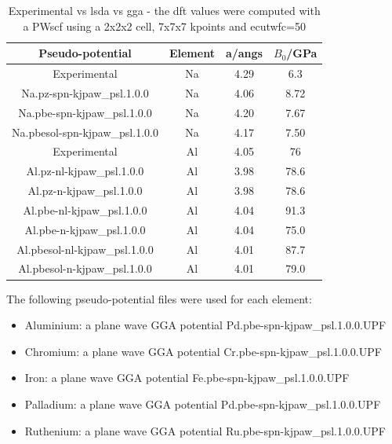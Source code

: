 \FloatBarrier 
\begin{table}[h]
\begin{center}
\renewcommand{\arraystretch}{1.2}
\begin{tabular}{c c c c}
\hline\hline
Pseudo-potential & Element & a/angs & $B_0$/GPa \\
\hline\hline
Experimental    & Na      & 4.29\cite{periodictablena} & 6.3\cite{periodictablena} \\
Na.pz-spn-kjpaw\_psl.1.0.0 & Na & 4.06 & 8.72 \\
Na.pbe-spn-kjpaw\_psl.1.0.0 & Na & 4.20 & 7.67 \\
Na.pbesol-spn-kjpaw\_psl.1.0.0 & Na & 4.17 & 7.50 \\
Experimental    & Al      & 4.05\cite{periodictableal} & 76\cite{periodictableal} \\
Al.pz-nl-kjpaw\_psl.1.0.0 & Al & 3.98 & 78.6 \\
Al.pz-n-kjpaw\_psl.1.0.0 & Al & 3.98 & 78.6 \\
Al.pbe-nl-kjpaw\_psl.1.0.0 & Al & 4.04 & 91.3 \\
Al.pbe-n-kjpaw\_psl.1.0.0 & Al & 4.04 & 75.0 \\
Al.pbesol-nl-kjpaw\_psl.1.0.0 & Al & 4.01 & 87.7 \\
Al.pbesol-n-kjpaw\_psl.1.0.0 & Al & 4.01 & 79.0 \\
\hline\hline
\end{tabular}
\end{center}
\caption{Experimental vs \acrshort{lsda} vs \acrshort{gga} - the \acrshort{dft} values were computed with a PWscf\cite{quantumespresso} using a 2x2x2 cell, 7x7x7 kpoints and ecutwfc=50}
\label{table:ggavslsdacopy}
\end{table}

\FloatBarrier 

The following pseudo-potential files were used for each element:

\begin{itemize}
\item Aluminium: a plane wave GGA potential Pd.pbe-spn-kjpaw\_psl.1.0.0.UPF
\item Chromium: a plane wave GGA potential Cr.pbe-spn-kjpaw\_psl.1.0.0.UPF
\item Iron: a plane wave GGA potential Fe.pbe-spn-kjpaw\_psl.1.0.0.UPF 
\item Palladium: a plane wave GGA potential Pd.pbe-spn-kjpaw\_psl.1.0.0.UPF
\item Ruthenium: a plane wave GGA potential Ru.pbe-spn-kjpaw\_psl.1.0.0.UPF
\end{itemize}

